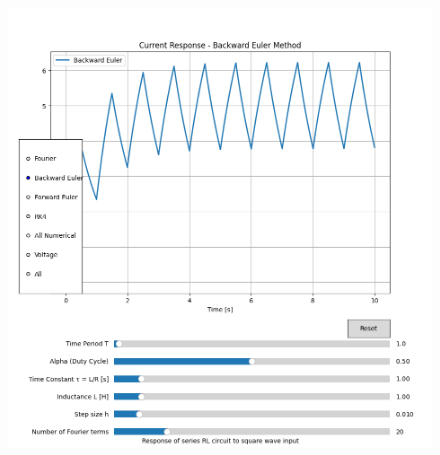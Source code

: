 \documentclass[12pt,a4paper]{report}
\begin{document}
\begin{itemize}
\begin{itemize}
\begin{figure}[h!]
	\includegraphics[scale=0.6]{figs/tau=T-2.png}
        \end{figure}
    

\end{itemize}
\end{itemize}
\end{document}
